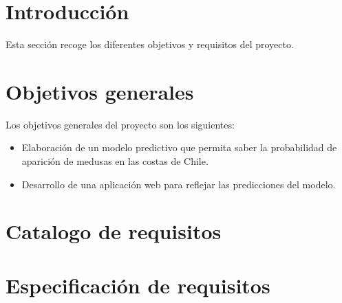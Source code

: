 
\section{Introducción}
Esta sección recoge los diferentes objetivos y requisitos del proyecto.

\section{Objetivos generales}
Los objetivos generales del proyecto son los siguientes:
\begin{itemize}
	\item Elaboración de un modelo predictivo que permita saber la probabilidad de aparición de medusas en las costas de Chile.
	\item Desarrollo de una aplicación web para reflejar las predicciones del modelo.
\end{itemize}
\section{Catalogo de requisitos}

\section{Especificación de requisitos}


